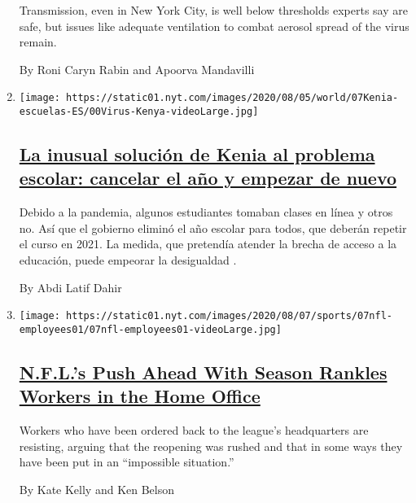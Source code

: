\begin{enumerate}
  Transmission, even in New York City, is well below thresholds experts
  say are safe, but issues like adequate ventilation to combat aerosol
  spread of the virus remain.

  By Roni Caryn Rabin and Apoorva Mandavilli
\item
  \texttt{[image: https://static01.nyt.com/images/2020/08/05/world/07Kenia-escuelas-ES/00Virus-Kenya-videoLarge.jpg]}

  \hypertarget{la-inusual-soluciuxf3n-de-kenia-al-problema-escolar-cancelar-el-auxf1o-y-empezar-de-nuevo}{%
  \subsection{\texorpdfstring{\href{/es/2020/08/07/espanol/mundo/cierre-escuela-coronavirus-kenia.html}{La
  inusual solución de Kenia al problema escolar: cancelar el año y
  empezar de
  nuevo}}{La inusual solución de Kenia al problema escolar: cancelar el año y empezar de nuevo}}\label{la-inusual-soluciuxf3n-de-kenia-al-problema-escolar-cancelar-el-auxf1o-y-empezar-de-nuevo}}

  Debido a la pandemia, algunos estudiantes tomaban clases en línea y
  otros no. Así que el gobierno eliminó el año escolar para todos, que
  deberán repetir el curso en 2021. La medida, que pretendía atender la
  brecha de acceso a la educación, puede empeorar la desigualdad .

  By Abdi Latif Dahir
\item
  \texttt{[image: https://static01.nyt.com/images/2020/08/07/sports/07nfl-employees01/07nfl-employees01-videoLarge.jpg]}

  \hypertarget{nfls-push-ahead-with-season-rankles-workers-in-the-home-office}{%
  \subsection{\texorpdfstring{\href{/2020/08/07/sports/football/coronavirus-nfl-restart-season.html}{N.F.L.'s
  Push Ahead With Season Rankles Workers in the Home
  Office}}{N.F.L.'s Push Ahead With Season Rankles Workers in the Home Office}}\label{nfls-push-ahead-with-season-rankles-workers-in-the-home-office}}

  Workers who have been ordered back to the league's headquarters are
  resisting, arguing that the reopening was rushed and that in some ways
  they have been put in an ``impossible situation.''

  By Kate Kelly and Ken Belson
\end{enumerate}

